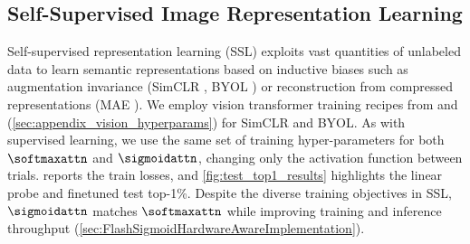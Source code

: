 \subsection{Self-Supervised Image Representation Learning}
\label{sec:ssl}
Self-supervised representation learning (SSL) exploits vast quantities of unlabeled data to learn semantic representations based on inductive biases such as augmentation invariance (SimCLR \cite{DBLP:conf/icml/ChenK0H20}, BYOL \citep{DBLP:conf/nips/GrillSATRBDPGAP20}) or reconstruction from compressed representations (MAE \citep{DBLP:conf/cvpr/HeCXLDG22}). We employ vision transformer training recipes from \cite{DBLP:conf/icml/ZhaiLLBR0GS23} and \cite{DBLP:conf/nips/BusbridgeRALDCW23} (\cref{sec:appendix_vision_hyperparams}) for SimCLR and BYOL. As with supervised learning, we use the same set of training hyper-parameters for both $\softmaxattn$ and $\sigmoidattn$, changing only the activation function between trials.  reports the train losses, and \cref{fig:test_top1_results} highlights the linear probe and finetuned test top-1\%. Despite the diverse training objectives in SSL, $\sigmoidattn$ matches $\softmaxattn$ while improving training and inference throughput (\cref{sec:FlashSigmoidHardwareAwareImplementation}).
